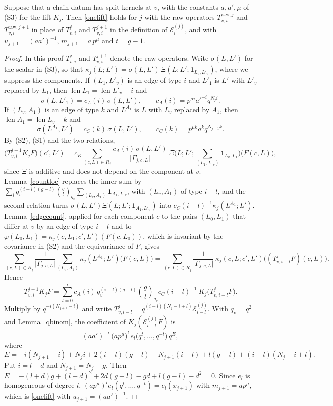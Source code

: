 \begin{proposition}\label{hkpoint}
Suppose that a chain datum has split kernels at $v$, with the constants $a,a',\mu$ of (S3) for the lift $K_j$. Then \eqref{onelift} holds for $j$ with the raw operators $T^{\mathrm{raw},j}_{v,i}$ and $T^{\mathrm{raw},j+1}_{v,i}$ in place of $T^j_{v,i}$ and $T^{j+1}_{v,i}$ in the definition of $\mathcal E^{(j)}_i$, and with $u_{j+1}=(aa')^{-1}$, $m_{j+1}=a\,p^{\mu}$ and $t=g-1$.
\end{proposition}

\begin{proof}
In this proof $T^j_{v,i}$ and $T^{j+1}_{v,i}$ denote the raw operators. Write $\sigma(L,L')$ for the scalar in (S3), so that $\kappa_j(L;L')=\sigma(L,L')\,\Xi(L;L';\mathbf 1_{L_v,L'_v})$, where we suppress the components. If $(L_1,L'_v)$ is an edge of type $i$ and $L'_1$ is $L'$ with $L'_v$ replaced by $L_1$, then $\operatorname{len}L_1=\operatorname{len}L'_v-i$ and
\[
\sigma(L,L'_1)=c_A(i)\,\sigma(L,L'),\qquad c_A(i)=p^{\mu i}a'^{-i}q^{N_ji}.
\]
If $(L_v,A_1)$ is an edge of type $k$ and $L^{A_1}$ is $L$ with $L_v$ replaced by $A_1$, then $\operatorname{len}A_1=\operatorname{len}L_v+k$ and
\[
\sigma(L^{A_1},L')=c_C(k)\,\sigma(L,L'),\qquad c_C(k)=p^{\mu k}a^kq^{N_{j+1}k}.
\]
By (S2), (S1) and the two relations,
\[
\big(T^{j+1}_{v,i}K_jF\big)(c',L')=c_K\sum_{(c,L)\in R_j}\frac{c_A(i)\,\sigma(L,L')}{\lvert\Gamma_{j,c,L}\rvert}\ \Xi\Big(L;L';\sum_{(L_1,L'_v)}\mathbf 1_{L_v,L_1}\Big)\big(F(c,L)\big),
\]
since $\Xi$ is additive and does not depend on the component at $v$. Lemma~\ref{countloc} replaces the inner sum by $\sum_lq_v^{(i-l)(g-l)}\binom gl_{q_v}\sum_{(L_v,A_1)}\mathbf 1_{A_1,L'_v}$, with $(L_v,A_1)$ of type $i-l$, and the second relation turns $\sigma(L,L')\Xi(L;L';\mathbf 1_{A_1,L'_v})$ into $c_C(i-l)^{-1}\kappa_j(L^{A_1};L')$. Lemma~\ref{edgecount}, applied for each component $c$ to the pairs $(L_0,L_1)$ that differ at $v$ by an edge of type $i-l$ and to $\varphi(L_0,L_1)=\kappa_j(c,L_1;c',L')(F(c,L_0))$, which is invariant by the covariance in (S2) and the equivariance of $F$, gives
\[
\sum_{(c,L)\in R_j}\frac1{\lvert\Gamma_{j,c,L}\rvert}\sum_{(L_v,A_1)}\kappa_j(L^{A_1};L')\big(F(c,L)\big)=\sum_{(c,L)\in R_j}\frac1{\lvert\Gamma_{j,c,L}\rvert}\,\kappa_j(c,L;c',L')\big((T^j_{v,i-l}F)(c,L)\big).
\]
Hence
\[
T^{j+1}_{v,i}K_jF=\sum_{l=0}^ic_A(i)\,q_v^{(i-l)(g-l)}\binom gl_{q_v}c_C(i-l)^{-1}\ K_j\big(T^j_{v,i-l}F\big).
\]
Multiply by $q^{-i(N_{j+1}-i)}$ and write $T^j_{v,i-l}=q^{(i-l)(N_j-i+l)}\mathcal E^{(j)}_{i-l}$. With $q_v=q^2$ and Lemma~\ref{qbinom}, the coefficient of $K_j(\mathcal E^{(j)}_{i-l}F)$ is
\[
(aa')^{-i}\,\big(ap^\mu\big)^l\,e_l\big(q^t,\dots,q^{-t}\big)\,q^{E},
\]
where
\[
E=-i(N_{j+1}-i)+N_ji+2(i-l)(g-l)-N_{j+1}(i-l)+l(g-l)+(i-l)(N_j-i+l).
\]
Put $i=l+d$ and $N_{j+1}=N_j+g$. Then $E=-(l+d)g+(l+d)^2+2d(g-l)-gd+l(g-l)-d^2=0$. Since $e_l$ is homogeneous of degree $l$, $(ap^\mu)^le_l(q^t,\dots,q^{-t})=e_l(x_{j+1})$ with $m_{j+1}=ap^\mu$, which is \eqref{onelift} with $u_{j+1}=(aa')^{-1}$.
\end{proof}

